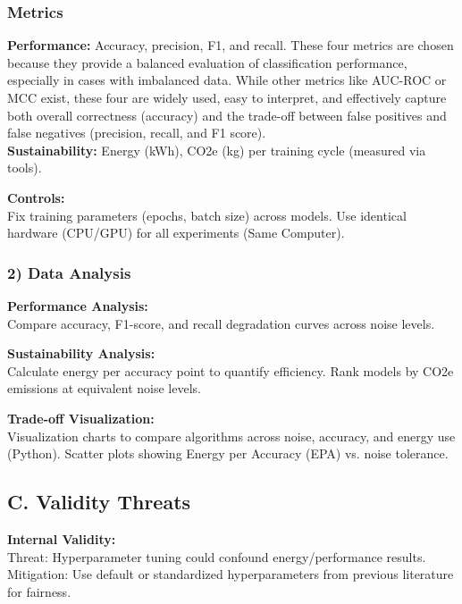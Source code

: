 \documentclass[conference]{IEEEtran}
\begin{document}
\subsubsection*{Metrics}
\newline

\textbf{Performance:} Accuracy, precision, F1, and recall. These four metrics are chosen because they provide a balanced evaluation of classification performance, especially in cases with imbalanced data. While other metrics like AUC-ROC or MCC exist, these four are widely used, easy to interpret, and effectively capture both overall correctness (accuracy) and the trade-off between false positives and false negatives (precision, recall, and F1 score).\\[0.5em]
\textbf{Sustainability:} Energy (kWh), CO2e (kg) per training cycle (measured via tools).

\vspace{0.5em}
\textbf{Controls:}\\
Fix training parameters (epochs, batch size) across models. Use identical hardware (CPU/GPU) for all experiments (Same Computer).

\vspace{0.5em}
\subsubsection*{2) Data Analysis}

\textbf{Performance Analysis:}\\
Compare accuracy, F1-score, and recall degradation curves across noise levels.

\vspace{0.5em}
\textbf{Sustainability Analysis:}\\
Calculate energy per accuracy point to quantify efficiency. Rank models by CO2e emissions at equivalent noise levels.

\vspace{0.5em}
\textbf{Trade-off Visualization:}\\
Visualization charts to compare algorithms across noise, accuracy, and energy use (Python). Scatter plots showing Energy per Accuracy (EPA) vs. noise tolerance.

\vspace{0.5em}
\subsection*{C. Validity Threats}

\textbf{Internal Validity:}\\
Threat: Hyperparameter tuning could confound energy/performance results. Mitigation: Use default or standardized hyperparameters from previous literature for fairness.
\end{document}
